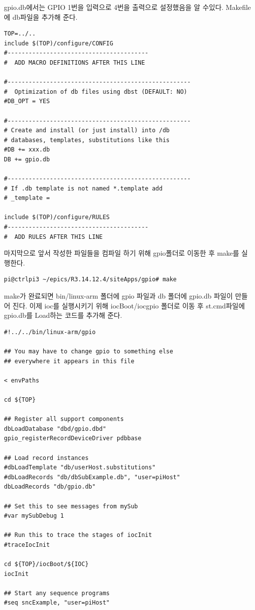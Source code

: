 \documentclass[11pt
  , a4paper
  , article
  , oneside
]{memoir}
\begin{document}
gpio.db에서는 GPIO 1번을 입력으로 4번을 출력으로 설정했음을 알 수있다. 
Makefile에 db파일을 추가해 준다.
\begin{lstlisting}[style=termstyle]
TOP=../..
include $(TOP)/configure/CONFIG
#----------------------------------------
#  ADD MACRO DEFINITIONS AFTER THIS LINE

#----------------------------------------------------
#  Optimization of db files using dbst (DEFAULT: NO)
#DB_OPT = YES

#----------------------------------------------------
# Create and install (or just install) into /db
# databases, templates, substitutions like this
#DB += xxx.db
DB += gpio.db

#----------------------------------------------------
# If .db template is not named *.template add
# _template = 

include $(TOP)/configure/RULES
#----------------------------------------
#  ADD RULES AFTER THIS LINE
\end{lstlisting}
마지막으로 앞서 작성한 파일들을 컴파일 하기 위해 gpio폴더로 이동한 후 make를 실행한다.
\begin{lstlisting}[style=termstyle]
pi@ctrlpi3 ~/epics/R3.14.12.4/siteApps/gpio# make
\end{lstlisting}
make가 완료되면 bin/linux-arm 폴더에 gpio 파일과 db 폴더에 gpio.db 파일이 만들어 진다.
이제 ioc를 실행시키기 위해 iocBoot/iocgpio 폴더로 이동 후 st.cmd파일에 gpio.db를 Load하는 코드를 
추가해 준다.
\begin{lstlisting}[style=termstyle]
#!../../bin/linux-arm/gpio

## You may have to change gpio to something else
## everywhere it appears in this file

< envPaths

cd ${TOP}

## Register all support components
dbLoadDatabase "dbd/gpio.dbd"
gpio_registerRecordDeviceDriver pdbbase

## Load record instances
#dbLoadTemplate "db/userHost.substitutions"
#dbLoadRecords "db/dbSubExample.db", "user=piHost"
dbLoadRecords "db/gpio.db"

## Set this to see messages from mySub
#var mySubDebug 1

## Run this to trace the stages of iocInit
#traceIocInit

cd ${TOP}/iocBoot/${IOC}
iocInit

## Start any sequence programs
#seq sncExample, "user=piHost"
\end{lstlisting}
\end{document}
